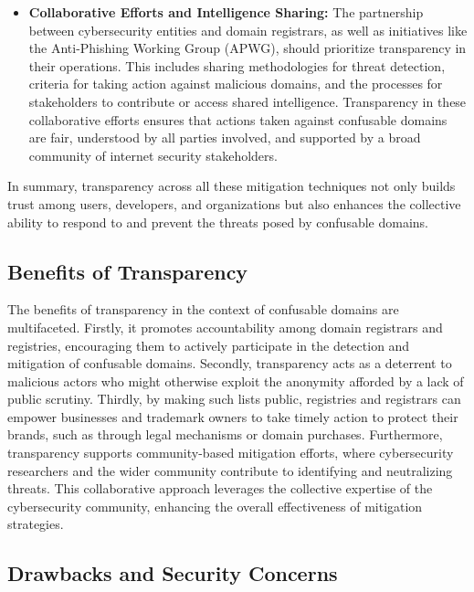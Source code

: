 \begin{itemize}
  \item \textbf{Collaborative Efforts and Intelligence Sharing: }The partnership between cybersecurity entities and domain registrars, as well as initiatives like the Anti-Phishing Working Group (APWG), should prioritize transparency in their operations. This includes sharing methodologies for threat detection, criteria for taking action against malicious domains, and the processes for stakeholders to contribute or access shared intelligence. Transparency in these collaborative efforts ensures that actions taken against confusable domains are fair, understood by all parties involved, and supported by a broad community of internet security stakeholders.
  
\end{itemize}

In summary, transparency across all these mitigation techniques not only builds trust among users, developers, and organizations but also enhances the collective ability to respond to and prevent the threats posed by confusable domains.

\subsection{Benefits of Transparency }

The benefits of transparency in the context of confusable domains are multifaceted. Firstly, it promotes accountability among domain registrars and registries, encouraging them to actively participate in the detection and mitigation of confusable domains. Secondly, transparency acts as a deterrent to malicious actors who might otherwise exploit the anonymity afforded by a lack of public scrutiny. Thirdly, by making such lists public, registries and registrars can empower businesses and trademark owners to take timely action to protect their brands, such as through legal mechanisms or domain purchases. Furthermore, transparency supports community-based mitigation efforts, where cybersecurity researchers and the wider community contribute to identifying and neutralizing threats. This collaborative approach leverages the collective expertise of the cybersecurity community, enhancing the overall effectiveness of mitigation strategies.

\subsection{Drawbacks and Security Concerns} 

